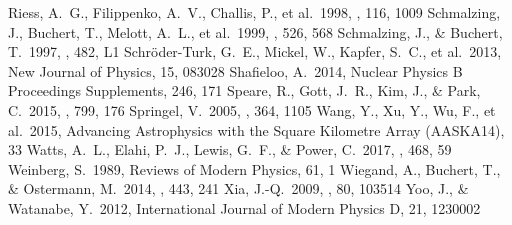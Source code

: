 \documentclass[a4paper,fleqn,usenatbib]{mnras}
\begin{document}
\begin{thebibliography}{99}
 Riess, A.~G., Filippenko, A.~V., Challis, P., et al.\ 1998, \aj, 116, 1009
 Schmalzing, J., Buchert, T., Melott, A.~L., et al.\ 1999, \apj, 526, 568 
 Schmalzing, J., \& Buchert, T.\ 1997, \apjl, 482, L1 
 Schr{\"o}der-Turk, G.~E., Mickel, W., Kapfer, S.~C., et al.\ 2013, New Journal of Physics, 15, 083028 
 Shafieloo, A.\ 2014, Nuclear Physics B Proceedings Supplements, 246, 171 
 Speare, R., Gott, J.~R., Kim, J., \& Park, C.\ 2015, \apj, 799, 176 
 Springel, V.\ 2005, \mnras, 364, 1105 
 Wang, Y., Xu, Y., Wu, F., et al.\ 2015, Advancing Astrophysics with the Square Kilometre Array (AASKA14), 33 
 Watts, A.~L., Elahi, P.~J., Lewis, G.~F., \& Power, C.\ 2017, \mnras, 468, 59 
 Weinberg, S.\ 1989, Reviews of Modern Physics, 61, 1  
 Wiegand, A., Buchert, T., \& Ostermann, M.\ 2014, \mnras, 443, 241 
 Xia, J.-Q.\ 2009, \prd, 80, 103514 
 Yoo, J., \& Watanabe, Y.\ 2012, International Journal of Modern Physics D, 21, 1230002
\end{thebibliography}







\bsp	%
\label{lastpage}
\end{document}
